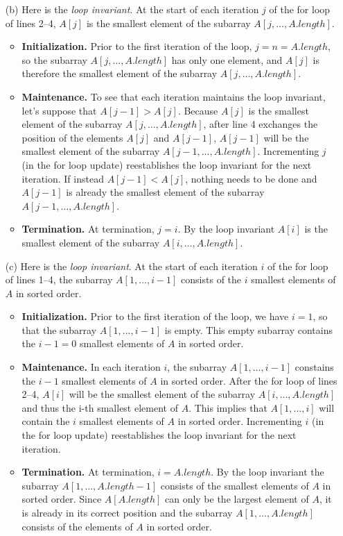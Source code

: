 \begin{enumerate}
\begin{framed}
\begin{enumerate}
\item[(b)] Here is the \emph{loop invariant}. At the start of each iteration $j$
  of the for loop of lines 2{--}4, $A[j]$ is the smallest element of the subarray
$A[j, \dots, A.length]$.
\begin{itemize}
  \item \textbf{Initialization.} Prior to the first iteration of the loop, $j
    = n = A.length$, so the subarray $A[j, \dots, A.length]$ has only one
    element, and $A[j]$ is therefore the smallest element of the subarray $A[j,
    \dots, A.length]$.
  \item \textbf{Maintenance.} To see that each iteration maintains the loop
    invariant, let's suppose that $A[j - 1] > A[j]$. Because $A[j]$ is the
    smallest element of the subarray $A[j, \dots, A.length]$, after line
    4 exchanges the position of the elements $A[j]$ and $A[j - 1]$, $A[j - 1]$
    will be the smallest element of the subarray $A[j - 1, \dots, A.length]$.
    Incrementing $j$ (in the for loop update) reestablishes the loop invariant
    for the next iteration. If instead $A[j - 1] < A[j]$, nothing needs to be
    done and $A[j - 1]$ is already the smallest element of the subarray $A[j
    - 1, \dots, A.length]$.
  \item \textbf{Termination.} At termination, $j = i$. By the loop invariant
    $A[i]$ is the smallest element of the subarray $A[i, \dots, A.length]$.
\end{itemize}

\item[(c)] Here is the \emph{loop invariant}. At the start of each iteration $i$
of the for loop of lines 1{--}4, the subarray $A[1, \dots, i - 1]$ consists of
the $i$ smallest elements of $A$ in sorted order.
\begin{itemize}
  \item \textbf{Initialization.} Prior to the first iteration of the loop, we
    have $i = 1$, so that the subarray $A[1, \dots, i - 1]$ is empty. This empty
    subarray contains the $i - 1 = 0$ smallest elements of $A$ in sorted order.
  \item \textbf{Maintenance.} In each iteration $i$, the subarray $A[1, \dots,
    i - 1]$ constains the $i - 1$ smallest elements of $A$ in sorted order.
    After the for loop of lines 2{--}4, $A[i]$ will be the smallest element of
    the subarray $A[i, \dots, A.length]$ and thus the i-th smallest element of
    $A$. This implies that $A[1, \dots, i]$ will contain the $i$ smallest
    elements of $A$ in sorted order. Incrementing $i$ (in the for loop update)
    reestablishes the loop invariant for the next iteration.
  \item \textbf{Termination.} At termination, $i = A.length$. By the loop
    invariant the subarray $A[1, \dots, A.length - 1]$ consists of the smallest
    elements of $A$ in sorted order. Since $A[A.length]$ can only be the largest
    element of $A$, it is already in its correct position and the subarray $A[1,
    \dots, A.length]$ consists of the elements of $A$ in sorted order.
\end{itemize}


\end{enumerate}
\end{framed}
\end{enumerate}
